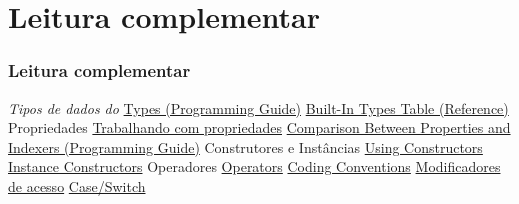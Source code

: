 \documentclass{beamer}
\begin{document}
\section{Leitura complementar}
\begin{frame}
\frametitle{Leitura complementar}
\begin{outline}
	\1 \textit{Tipos de dados do \CS}		
	\2 \href{https://docs.microsoft.com/en-us/dotnet/csharp/programming-guide/types/index}{Types (\CS Programming Guide)}
	\2 \href{http://msdn.microsoft.com/en-us/library/ya5y69ds.aspx}{Built-In Types Table (\CS Reference)}
	\1 Propriedades 
	\2 \href{https://docs.microsoft.com/en-us/dotnet/csharp/programming-guide/classes-and-structs/properties}{Trabalhando com propriedades}
	\2 \href{https://docs.microsoft.com/en-us/dotnet/csharp/programming-guide/indexers/comparison-between-properties-and-indexers}{Comparison Between Properties and Indexers (\CS Programming Guide)}
	\1 Construtores e Instâncias
	\2 \href{https://docs.microsoft.com/en-us/dotnet/csharp/programming-guide/classes-and-structs/using-constructors}{ Using Constructors }
	\2 \href{https://docs.microsoft.com/en-us/dotnet/csharp/programming-guide/classes-and-structs/instance-constructors}{Instance Constructors}
	\1 Operadores
	\2 \href{https://docs.microsoft.com/en-us/dotnet/csharp/programming-guide/statements-expressions-operators/operators}{Operators}
	\1 \href{https://docs.microsoft.com/en-us/dotnet/csharp/programming-guide/inside-a-program/coding-conventions}{\CS Coding Conventions}
	\1 \href{https://docs.microsoft.com/en-us/dotnet/csharp/language-reference/keywords/access-modifiers}{Modificadores de acesso}
	\1 \href{https://docs.microsoft.com/en-us/dotnet/csharp/language-reference/keywords/switch}{Case/Switch}
\end{outline}
\end{frame}
\end{document}
